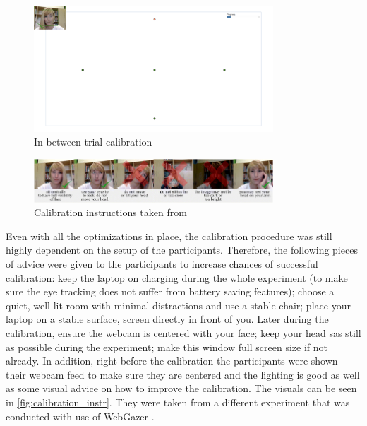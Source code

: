 \begin{figure}
    \centering
    \includegraphics[width=0.8\textwidth]{images/inbetween_calibration_webcam.png}
    \caption{In-between trial calibration}
    \label{fig:inbetween_calibration_webcam}
\end{figure}

\begin{figure}
    \centering
    \includegraphics[width=0.8\textwidth]{images/calibration_instr.png}
    \caption{Calibration instructions taken from \cite{Semmelmann_2018}}
    \label{fig:calibration_instr}
\end{figure}

Even with all the optimizations in place, the calibration procedure was still highly dependent on the setup of the participants. Therefore, the following pieces of advice were given to the participants to increase chances of successful calibration: keep the laptop on charging during the whole experiment (to make sure the eye tracking does not suffer from battery saving features); choose a quiet, well-lit room with minimal distractions and use a stable chair; place your laptop on a stable surface, screen directly in front of you. Later during the calibration, ensure the webcam is centered with your face; keep your head sas still as possible during the experiment; make this window full screen size if not already. In addition, right before the calibration the participants were shown their webcam feed to make sure they are centered and the lighting is good as well as some visual advice on how to improve the calibration. The visuals can be seen in \autoref{fig:calibration_instr}. They were taken from a different experiment \cite{Semmelmann_2018} that was conducted with use of WebGazer \cite{wegbazer}.

